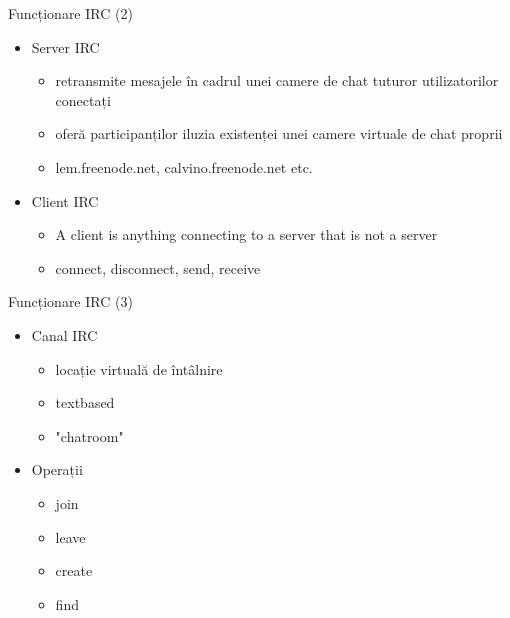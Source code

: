 \documentclass{beamer}
\begin{document}
    \begin{frame}{Funcționare IRC (2)}
    \begin{itemize}
    \setlength{\itemsep}{0.5cm}
    \item Server IRC
        \begin{itemize}
        \setlength{\itemsep}{0.2cm}
        \item retransmite mesajele în cadrul unei camere de chat tuturor utilizatorilor conectați
        \item oferă participanților iluzia existenței unei camere virtuale de chat proprii
        \item lem.freenode.net, calvino.freenode.net etc.
        \end{itemize}
    \item Client IRC
        \begin{itemize}
        \setlength{\itemsep}{0.2cm}
        \item A client is anything connecting to a server that is not a server
        \item connect, disconnect, send, receive
        \end{itemize}
    \end{itemize}
    \end{frame}

    \begin{frame}{Funcționare IRC (3)}
    \begin{itemize}
    \setlength{\itemsep}{0.5cm}
    \item Canal IRC
        \begin{itemize}
        \setlength{\itemsep}{0.2cm}
        \item locație virtuală de întâlnire
        \item textbased
        \item "chatroom"
        \end{itemize}
    \item Operații
        \begin{itemize}
        \setlength{\itemsep}{0.2cm}
        \item join
        \item leave
        \item create
        \item find
        \end{itemize}
    \end{itemize}
    \end{frame}
\end{document}

